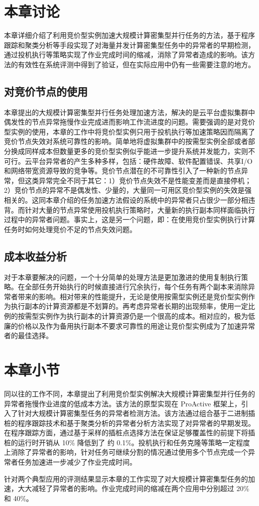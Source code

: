 \section{本章讨论}
本章详细介绍了利用竞价型实例加速大规模计算密集型并行任务的方法，基于程序跟踪和聚类分析等手段实现了对海量并发计算密集型任务中的异常者的早期检测，通过投机执行等策略实现了作业完成时间的缩减，消除了异常者造成的影响。该方法的有效性在系统评测中得到了验证，但在实际应用中仍有一些需要注意的地方。

\subsection{对竞价节点的使用}
本章提出的大规模计算密集型并行任务处理加速方法，解决的是云平台虚拟集群中偶发性的节点异常拖慢作业完成进而影响工作流进度的问题。需要强调的是对竞价型实例的使用，本章的工作中将竞价型实例只用于投机执行等加速策略因而隔离了竞价节点失效对系统可靠性的影响。简单地将虚拟集群中的按需型实例全部或者部分换成同样成本但数量更多的竞价型实例似乎能进一步提升系统并发能力，实则不可行。云平台异常者的产生多种多样，包括：硬件故障、软件配置错误、共享I/O和网络带宽资源导致的竞争等。竞价节点潜在的不可靠性引入了一种新的节点异常，但这类异常完全不同于其它：1）竞价节点失效不是性能变差而是直接停机；2）竞价节点的异常不是偶发性、少量的，大量同一可用区竞价型实例的失效是强相关的。这同本章介绍的任务加速方法假设的系统中的异常者只占很少一部分相违背。而针对大量的节点异常使用投机执行策略时，大量新的执行副本同样面临执行过程中的异常者问题。事实上，这是另一个问题，即：在使用竞价型实例执行计算任务时如何处理竞价不足的节点失效问题。

\subsection{成本收益分析}
对于本章要解决的问题，一个十分简单的处理方法是更加激进的使用复制执行策略。在全部任务开始执行的时候直接进行冗余执行，每个任务有两个副本来消除异常者带来的影响。相对带来的性能提升，无论是使用按需型实例还是竞价型实例作为执行副本的计算资源都是不划算的。再考虑异常者长期的出现频率，使用一定比例的按需型实例作为执行副本的计算资源仍是一个很高的成本。相对应的，极为低廉的价格以及作为备用执行副本不要求可靠性的用途让竞价型实例成为了加速异常者的最佳选择。

\section{本章小节}
同以往的工作不同，本章提出了利用竞价型实例解决大规模计算密集型并行任务的异常者拖慢作业进度的低成本方法。该方法的原型实现在 ProActive 框架上，引入了针对大规模计算密集型任务的异常者检测方法。该方法通过组合基于二进制插桩的程序跟踪技术和基于聚类分析的异常者分析方法实现了对异常者的早期发现。在程序跟踪方面，通过基于采样的插桩点选择方法在保证足够覆盖性的前提下将插桩的运行时开销从 10\% 降低到了 约 0.1\%。投机执行和任务克隆等策略一定程度上消除了异常者的影响，针对任务可继续分割的情况通过使用多个节点完成一个异常者任务加速进一步减少了作业完成时间。

针对两个典型应用的评测结果显示本章的工作实现了对大规模计算密集型任务的加速，大大减轻了异常者的影响。作业完成时间的缩减在两个应用中分别超过 20\% 和 40\%。